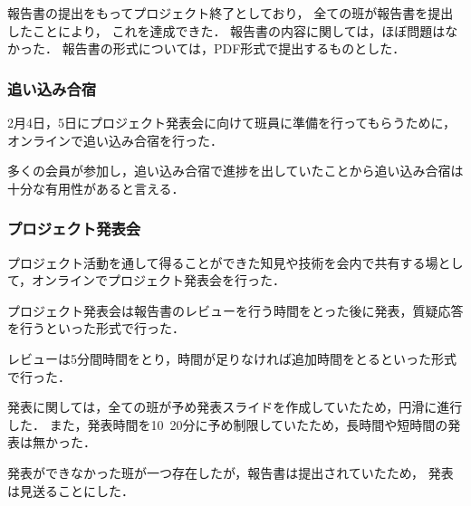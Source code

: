 報告書の提出をもってプロジェクト終了としており，
全ての班が報告書を提出したことにより，
これを達成できた．
報告書の内容に関しては，ほぼ問題はなかった．
報告書の形式については，PDF形式で提出するものとした．

\subsubsection*{追い込み合宿}
2月4日，5日にプロジェクト発表会に向けて班員に準備を行ってもらうために，オンラインで追い込み合宿を行った．

多くの会員が参加し，追い込み合宿で進捗を出していたことから追い込み合宿は十分な有用性があると言える．

\subsubsection*{プロジェクト発表会}

プロジェクト活動を通して得ることができた知見や技術を会内で共有する場として，オンラインでプロジェクト発表会を行った．

プロジェクト発表会は報告書のレビューを行う時間をとった後に発表，質疑応答を行うといった形式で行った．

レビューは5分間時間をとり，時間が足りなければ追加時間をとるといった形式で行った．

発表に関しては，全ての班が予め発表スライドを作成していたため，円滑に進行した．
また，発表時間を10~20分に予め制限していたため，長時間や短時間の発表は無かった．

発表ができなかった班が一つ存在したが，報告書は提出されていたため，
発表は見送ることにした．
